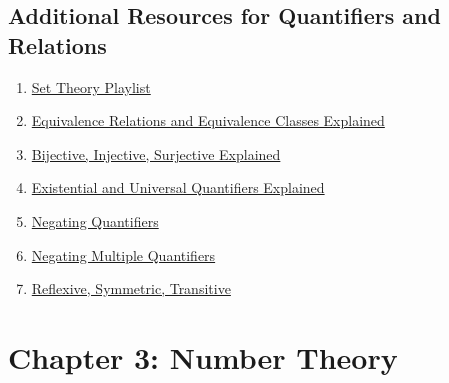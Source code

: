 \documentclass{article}
\begin{document}
\subsection*{Additional Resources for Quantifiers and Relations}
\begin{enumerate}
    \item \href{https://www.youtube.com/watch?v=tyDKR4FG3Yw&list=PLDDGPdw7e6Ag1EIznZ-m-qXu4XX3A0cIz}{Set Theory Playlist}
    \item \href{https://www.youtube.com/watch?v=ZgcTX16borA}{Equivalence Relations and Equivalence Classes Explained}
    \item \href{https://www.youtube.com/watch?v=bZred_Ksz2k&t=6s}{Bijective, Injective, Surjective Explained}
    \item \href{https://www.youtube.com/watch?v=GJpezCUMOxA}{Existential and Universal Quantifiers Explained}
    \item \href{https://www.youtube.com/watch?v=q1rKFGSiZE8}{Negating Quantifiers}
    \item \href{https://www.youtube.com/watch?v=jLVKV5LJjaw}{Negating Multiple Quantifiers}
    \item \href{https://www.youtube.com/watch?v=6fwJj14O_TM}{Reflexive, Symmetric, Transitive}
\end{enumerate}
\newpage

\section*{Chapter 3: Number Theory}
\end{document}
